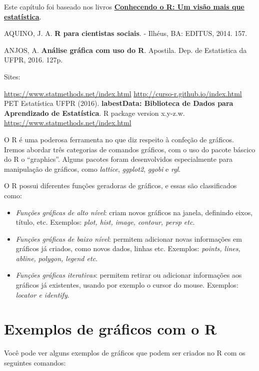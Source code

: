 \documentclass[
]{book}
\begin{document}
Este capítulo foi baseado nos livros \href{https://www.editoraufv.com.br/produto/conhecendo-o-r-uma-visao-mais-que-estatistica/1109294}{\textbf{Conhecendo o R: Um visão mais que estatística}}.

AQUINO, J. A. \textbf{R para cientistas sociais}. - Ilhéus, BA: EDITUS, 2014. 157.

ANJOS, A. \textbf{Análise gráfica com uso do R}. Apostila. Dep. de Estatistica da UFPR, 2016. 127p.

Sites:

\url{https://www.statmethods.net/index.html}
\url{http://curso-r.github.io/index.html} PET Estatística UFPR (2016). \textbf{labestData: Biblioteca de Dados para Aprendizado de Estatística}. R package version x.y-z.w.
\url{https://www.statmethods.net/index.html}

O R é uma poderosa ferramenta no que diz respeito à confeção de gráficos. Iremos abordar três categorias de comandos gráficos, com o uso do pacote báscico do R o ``graphics''. Alguns pacotes foram desenvolvidos especialmente para manipulação de gráficos, como \emph{lattice}, \emph{ggplot2}, \emph{ggobi} e \emph{rgl}.

O R possui diferentes funções geradoras de gráficos, e essas são classificados como:

\begin{itemize}
\item
  \emph{Funções gráficas de alto nível}: criam novos gráficos na janela, definindo eixos, título, etc. Exemplos: \emph{plot, hist, image, contour, persp etc}.
\item
  \emph{Funções gráficas de baixo nível}: permitem adicionar novas informações em gráficos já criados, como novos dados, linhas etc. Exemplos: \emph{points, lines, abline,} \emph{polygon, legend etc}.
\item
  \emph{Funções gráficas iterativas}: permitem retirar ou adicionar informações aos gráficos já existentes, usando por exemplo o cursor do mouse. Exemplos: \emph{locator e identify}.
\end{itemize}

\hypertarget{exemplos-de-gruxe1ficos-com-o-r}{%
\section{Exemplos de gráficos com o R}\label{exemplos-de-gruxe1ficos-com-o-r}}

Você pode ver alguns exemplos de gráficos que podem ser criados no R com os seguintes comandos:
\end{document}

